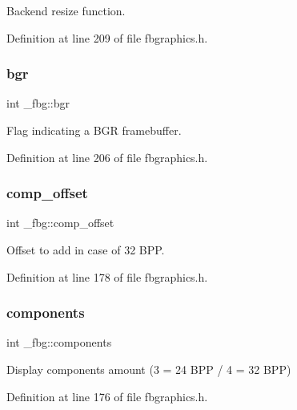 Backend resize function. 



Definition at line 209 of file fbgraphics.\+h.

\mbox{\label{struct__fbg_a5844c5bf4789117cbc0c972ff160b338}} 
\subsubsection{\texorpdfstring{bgr}{bgr}}
{\footnotesize\ttfamily int \+\_\+fbg\+::bgr}



Flag indicating a B\+GR framebuffer. 



Definition at line 206 of file fbgraphics.\+h.

\mbox{\label{struct__fbg_a7c2e64d2f40575c8a989c759c30acb0e}} 
\subsubsection{\texorpdfstring{comp\+\_\+offset}{comp\_offset}}
{\footnotesize\ttfamily int \+\_\+fbg\+::comp\+\_\+offset}



Offset to add in case of 32 B\+PP. 



Definition at line 178 of file fbgraphics.\+h.

\mbox{\label{struct__fbg_a1db77a2ef506723a575644dbc1cfb747}} 
\subsubsection{\texorpdfstring{components}{components}}
{\footnotesize\ttfamily int \+\_\+fbg\+::components}



Display components amount (3 = 24 B\+PP / 4 = 32 B\+PP) 



Definition at line 176 of file fbgraphics.\+h.

\mbox{\label{struct__fbg_a7090d672982fe465f2186dbfea384d32}} 
